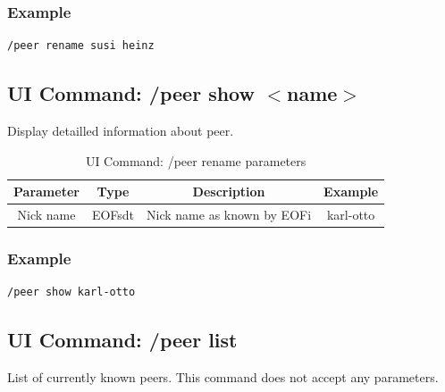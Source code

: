 \subsubsection{Example}
\begin{verbatim}
/peer rename susi heinz
\end{verbatim}
\subsection{UI Command: /peer show $<$name$>$}
Display detailled information about peer.
%
\begin{longtable}{|c|c|c|c|}
\caption{UI Command: /peer rename parameters}\\
\hline
\textbf{Parameter} & \textbf{Type} & \textbf{Description} & \textbf{Example}\\
\hline
Nick name & EOFsdt & Nick name as known by EOFi & karl-otto\\
\hline
\end{longtable}

\subsubsection{Example}
\begin{verbatim}
/peer show karl-otto
\end{verbatim}
\subsection{UI Command: /peer list}
List of currently known peers. This command does not accept any parameters.


